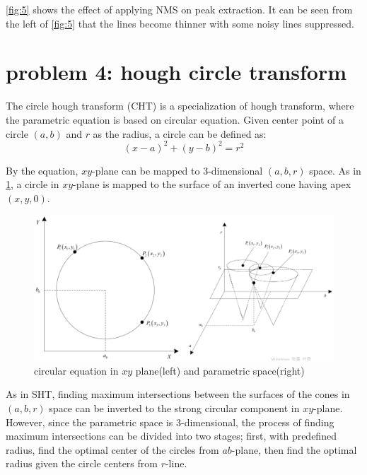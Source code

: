 \documentclass[extendedabs]{bmvc2k}
\begin{document}
\figurename{\ref{fig:5}} shows the effect of applying NMS on peak extraction. It can be seen from
the left of \figurename{\ref{fig:5}} that the lines become thinner with some noisy lines suppressed.

\section*{problem 4: hough circle transform}

The circle hough transform (CHT) is a specialization of hough transform, where the parametric equation
is based on circular equation. Given center point of a circle $(a, b)$ and $r$ as the radius, a circle
can be defined as:
\[(x-a)^2 + (y-b)^2 = r^2\]

By the equation, $xy$-plane can be mapped to 3-dimensional $(a, b, r)$ space. As in \figurename{\ref{fig:6}},
a circle in $xy$-plane is mapped to the surface of an inverted cone having apex $(x, y, 0)$.

\begin{figure}[h]
    \centering
    \includegraphics[width=\linewidth]{hw4_4_1}
    \caption{circular equation in $xy$ plane(left) and parametric space(right)}
    \label{fig:6}
\end{figure}

As in SHT, finding maximum intersections between the surfaces of the cones in $(a, b, r)$ space can be inverted
to the strong circular component in $xy$-plane. However, since the parametric space is 3-dimensional, the process of
finding maximum intersections can be divided into two stages; first, with predefined radius, find the optimal center
of the circles from $ab$-plane, then find the optimal radius given the circle centers from $r$-line. 
\end{document}
